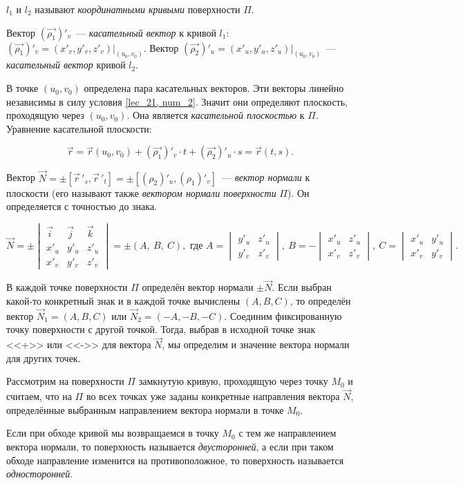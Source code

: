 \documentclass[../../main.tex]{subfiles}
\begin{document}
$l_1$ и $l_2$ называют \emph{координатными кривыми} поверхности $\Pi$.

Вектор $(\vec{\rho_1})'_v$~--- \emph{касательный вектор} к кривой $l_1$:
$(\vec{\rho_1})'_v = (x'_v, y'_v, z'_v) \Big|_{(u_0,v_0)}.$
Вектор $(\vec{\rho_2})'_u = (x'_u, y'_u, z'_u) \Big|_{(u_0,v_0)}$~--- 
\emph{касательный вектор} кривой $l_2$. 

В точке $(u_0, v_0)$ определена пара касательных векторов.
Эти векторы линейно независимы в силу условия \eqref{lec_21, num_2}. 
Значит они определяют плоскость, проходящую через $(u_0,v_0)$.
Она является \emph{касательной плоскостью} к $\Pi$. 
Уравнение касательной плоскости:

\[\vec{r} = \vec{r}(u_0,v_0) + (\vec{\rho_1})'_v \cdot t +
(\vec{\rho_2})'_u \cdot s = 
\vec{r}(t,s)
.\]

Вектор $\vec{N} = \pm \left[ \vec r\,'_s, \vec r\,'_t \right] = 
\pm \left[ (\rho_2)'_u, (\rho_1)'_v  \right]$~--- 
\emph{вектор нормали} к плоскости 
(его называют также \emph{вектором нормали поверхности} $\Pi$).
Он определяется с точностью до знака.

\[
\vec{N} = 
\pm \begin{vmatrix}
\vec{i} & \vec{j} & \vec{k} \\
x'_u & y'_u & z'_u \\
x'_v & y'_v & z'_v
\end{vmatrix} = 
\pm (A,\ B,\ C)
, \text{ где } A = \begin{vmatrix}
y'_u & z'_u \\
 y'_v & z'_v
\end{vmatrix},\ 
B = -\begin{vmatrix}
x'_u & z'_u \\
x'_v & z'_v
\end{vmatrix},\
C = \begin{vmatrix}
x'_u & y'_u \\
x'_v & y'_v
\end{vmatrix}
.\]

В каждой точке поверхности $\Pi$ определён вектор нормали $\pm \vec{N}$.
Если выбран какой-то конкретный знак и в каждой точке вычислены
$(A, B, C)$, то определён вектор $\vec{N}_1 = (A, B, C)$ или
$\vec{N}_2 = (-A, -B, -C)$.
Соединим фиксированную точку поверхности с другой точкой.
Тогда, выбрав в исходной точке знак <<+>> или <<->> для вектора $\vec{N}$,
мы определим и значение вектора нормали для других точек.

Рассмотрим на поверхности $\Pi$ замкнутую кривую, 
проходящую через точку $M_0$ и
считаем, что на $\Pi$ во всех точках уже заданы конкретные направления
вектора $\vec{N}$, определённые выбранным направлением вектора нормали в точке 
$M_0$. 

Если при обходе кривой мы возвращаемся в точку $M_0$ с тем же
направлением вектора нормали, то поверхность называется \emph{двусторонней},
а если при таком обходе направление изменится на противоположное,
то поверхность называется \emph{односторонней}.
\end{document}
